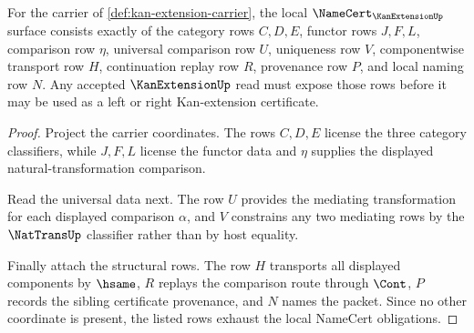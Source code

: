 \begin{theorem}
\label{thm:kan-extension-namecert-obligations}
For the carrier of \autoref{def:kan-extension-carrier}, the local $\NameCert_{\KanExtensionUp}$ surface consists exactly of the category rows $C,D,E$, functor rows $J,F,L$, comparison row $\eta$, universal comparison row $U$, uniqueness row $V$, componentwise transport row $H$, continuation replay row $R$, provenance row $P$, and local naming row $N$. Any accepted $\KanExtensionUp$ read must expose those rows before it may be used as a left or right Kan-extension certificate.
\end{theorem}
\begin{proof}
Project the carrier coordinates. The rows $C,D,E$ license the three category classifiers, while $J,F,L$ license the functor data and $\eta$ supplies the displayed natural-transformation comparison.

Read the universal data next. The row $U$ provides the mediating transformation for each displayed comparison $\alpha$, and $V$ constrains any two mediating rows by the $\NatTransUp$ classifier rather than by host equality.

Finally attach the structural rows. The row $H$ transports all displayed components by $\hsame$, $R$ replays the comparison route through $\Cont$, $P$ records the sibling certificate provenance, and $N$ names the packet. Since no other coordinate is present, the listed rows exhaust the local NameCert obligations.
\end{proof}


